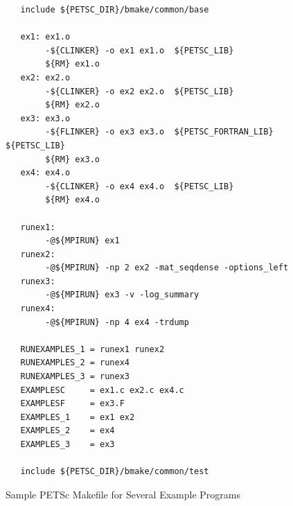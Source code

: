 {{{\begin{figure}[H]
{\begin{verbatim}
   include ${PETSC_DIR}/bmake/common/base

   ex1: ex1.o 
        -${CLINKER} -o ex1 ex1.o  ${PETSC_LIB}
        ${RM} ex1.o
   ex2: ex2.o 
        -${CLINKER} -o ex2 ex2.o  ${PETSC_LIB}
        ${RM} ex2.o
   ex3: ex3.o 
        -${FLINKER} -o ex3 ex3.o  ${PETSC_FORTRAN_LIB} ${PETSC_LIB}
        ${RM} ex3.o
   ex4: ex4.o 
        -${CLINKER} -o ex4 ex4.o  ${PETSC_LIB}
        ${RM} ex4.o

   runex1:
        -@${MPIRUN} ex1
   runex2:
        -@${MPIRUN} -np 2 ex2 -mat_seqdense -options_left
   runex3:
        -@${MPIRUN} ex3 -v -log_summary
   runex4:
        -@${MPIRUN} -np 4 ex4 -trdump

   RUNEXAMPLES_1 = runex1 runex2
   RUNEXAMPLES_2 = runex4
   RUNEXAMPLES_3 = runex3
   EXAMPLESC     = ex1.c ex2.c ex4.c
   EXAMPLESF     = ex3.F
   EXAMPLES_1    = ex1 ex2
   EXAMPLES_2    = ex4
   EXAMPLES_3    = ex3

   include ${PETSC_DIR}/bmake/common/test
\end{verbatim}
}
\caption{Sample PETSc Makefile for Several Example Programs}
\label{fig_make2}
\end{figure}

}}}
